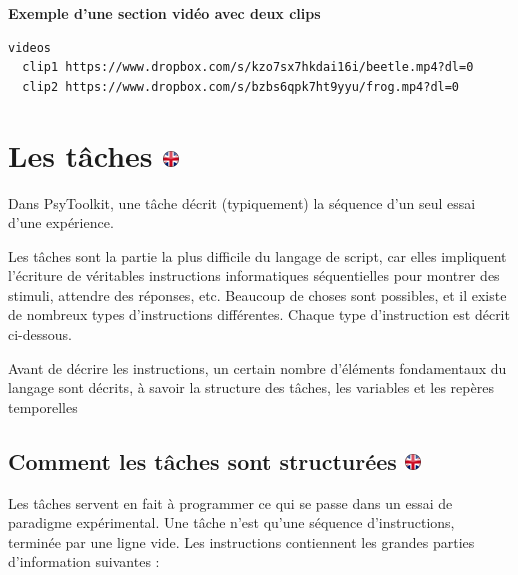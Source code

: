 \documentclass[
]{book}
\begin{document}
\textbf{Exemple d'une section vidéo avec deux clips}

\begin{verbatim}
videos
  clip1 https://www.dropbox.com/s/kzo7sx7hkdai16i/beetle.mp4?dl=0
  clip2 https://www.dropbox.com/s/bzbs6qpk7ht9yyu/frog.mp4?dl=0
\end{verbatim}

\hypertarget{les-tuxe2ches}{%
\section[Les tâches ]{\texorpdfstring{Les tâches \href{https://www.psytoolkit.org/doc3.4.0/syntax.html\#task}{\protect\includegraphics{img/ukflag.png}}}{Les tâches }}\label{les-tuxe2ches}}

Dans PsyToolkit, une tâche décrit (typiquement) la séquence d'un seul essai d'une expérience.

Les tâches sont la partie la plus difficile du langage de script, car elles impliquent l'écriture de véritables instructions informatiques séquentielles pour montrer des stimuli, attendre des réponses, etc. Beaucoup de choses sont possibles, et il existe de nombreux types d'instructions différentes. Chaque type d'instruction est décrit ci-dessous.

Avant de décrire les instructions, un certain nombre d'éléments fondamentaux du langage sont décrits, à savoir la structure des tâches, les variables et les repères temporelles

\hypertarget{comment-les-tuxe2ches-sont-structuruxe9es}{%
\subsection[Comment les tâches sont structurées ]{\texorpdfstring{Comment les tâches sont structurées \href{https://www.psytoolkit.org/doc3.4.0/syntax.html\#_how_tasks_are_structured}{\protect\includegraphics{img/ukflag.png}}}{Comment les tâches sont structurées }}\label{comment-les-tuxe2ches-sont-structuruxe9es}}

Les tâches servent en fait à programmer ce qui se passe dans un essai de paradigme expérimental. Une tâche n'est qu'une séquence d'instructions, terminée par une ligne vide. Les instructions contiennent les grandes parties d'information suivantes :
\end{document}
